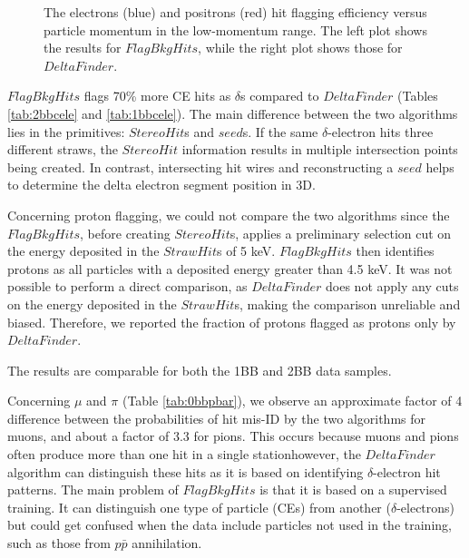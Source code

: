 \begin{figure}[!h]
\begin{subfigure}[t]{0.5\textwidth}
        \caption{}
        \label{fig:eff2}
    \end{subfigure}
    \caption[The electrons (blue) and positrons (red) hit flagging efficiency versus 
    particle momentum in the low-momentum range.]{The electrons 
    (blue) and positrons (red) hit flagging efficiency versus 
    particle momentum in the low-momentum range. The left plot shows the 
    results for $FlagBkgHits$, while the right plot shows those for $DeltaFinder$.
    }
    \label{fig:efficiency}
  \end{figure} 

$FlagBkgHits$ flags 70\% more CE hits 
as $\delta$s compared to $DeltaFinder$ (Tables \ref{tab:2bbcele} 
and \ref{tab:1bbcele}). The main difference between the two algorithms lies in 
the primitives: $StereoHit$s and $seed$s. If the same 
$\delta$-electron hits three different straws, the $StereoHit$ 
information results in multiple intersection points being 
created. In contrast, intersecting hit wires and reconstructing a $seed$ helps 
to determine the delta electron segment position in 3D.

Concerning proton flagging, we could not compare the two 
algorithms since the $FlagBkgHits$, before creating $StereoHit$s, 
applies a preliminary selection cut on the energy deposited in 
the $StrawHit$s of 5 keV. $FlagBkgHits$ then identifies 
protons as all particles with a deposited energy greater than 
4.5 keV. It was not possible to perform a direct comparison, 
as $DeltaFinder$ does not apply any cuts on the energy deposited in 
the $StrawHit$s, making the comparison unreliable and biased. 
Therefore, we reported the fraction of protons flagged as protons only by $DeltaFinder$.

The results are comparable for both the 1BB and 2BB data samples.



      
      Concerning $\mu$ and $\pi$ (Table \ref{tab:0bbpbar}), 
      we observe an approximate factor of 
      4 difference between the probabilities of hit mis-ID by the two algorithms 
      for muons, and about a factor of 3.3 for pions. This occurs because 
      muons and pions often produce more than one hit in a single stationhowever, the 
      $DeltaFinder$ algorithm can distinguish these hits as it 
      is based on identifying $\delta$-electron hit patterns. 
      The main problem of $FlagBkgHits$ is that it is based on a supervised 
      training. It can distinguish one type of particle (CEs) from 
      another ($\delta$-electrons) but could get confused when 
      the data include particles not used in the training, such as 
      those from $p\bar{p}$ annihilation. 
      
